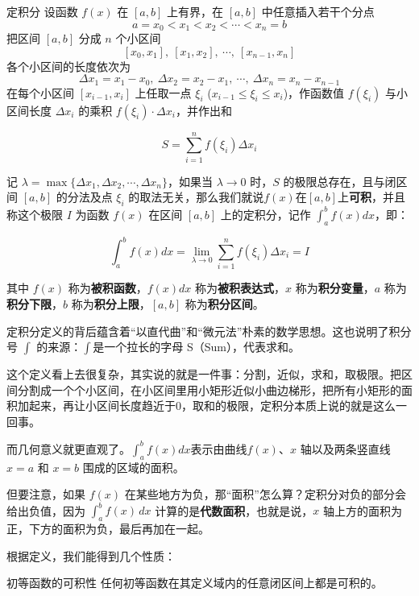 \begin{definition}{定积分}{}
设函数 \(f(x)\) 在 \([a,b]\) 上有界，在 \([a,b]\) 中任意插入若干个分点
\[
a=x_0<x_1<x_2<\cdots<x_n=b
\]
把区间 \([a,b]\) 分成 \(n\) 个小区间
\[
[x_0,x_1], \ [x_1,x_2], \ \cdots, \ [x_{n-1},x_n]
\]
各个小区间的长度依次为
\[
\Delta x_1=x_1-x_0, \ \Delta x_2=x_2-x_1, \ \cdots, \ \Delta x_n=x_n-x_{n-1}
\]
在每个小区间 \([x_{i-1},x_i]\) 上任取一点 \(\xi_i\) (\(x_{i-1} \leqslant \xi_i \leqslant x_i\))，作函数值 \(f(\xi_i)\) 与小区间长度 \(\Delta x_i\) 的乘积 \(f(\xi_i) \cdot \Delta x_i\)，并作出和

\[
S=\sum_{i=1}^{n} f(\xi_i) \Delta x_i
\]

记 \(\lambda = \max\{\Delta x_1, \Delta x_2, \cdots, \Delta x_n\}\)，如果当 \(\lambda \to 0\) 时，\(S\) 的极限总存在，且与闭区间 \([a,b]\) 的分法及点 \(\xi_i\) 的取法无关，那么我们就说\(f(x)\)在\([a,b]\)上\textbf{可积}，并且称这个极限 \(I\) 为函数 \(f(x)\) 在区间 \([a,b]\) 上的定积分，记作 \(\int_{a}^{b} f(x) dx\)，即：

\[
\int_{a}^{b} f(x) dx = \lim_{\lambda \to 0} \sum_{i=1}^{n} f(\xi_i) \Delta x_i = I
\]

其中 \(f(x)\) 称为\textbf{被积函数}，\(f(x) dx\) 称为\textbf{被积表达式}，\(x\) 称为\textbf{积分变量}，\(a\) 称为\textbf{积分下限}，\(b\) 称为\textbf{积分上限}，\([a,b]\) 称为\textbf{积分区间}。

\end{definition}

定积分定义的背后蕴含着“以直代曲”和“微元法”朴素的数学思想。这也说明了积分号 $\int$ 的来源：$\int$是一个拉长的字母 S（Sum），代表求和。

这个定义看上去很复杂，其实说的就是一件事：分割，近似，求和，取极限。把区间分割成一个个小区间，在小区间里用小矩形近似小曲边梯形，把所有小矩形的面积加起来，再让小区间长度趋近于$0$，取和的极限，定积分本质上说的就是这么一回事。

而几何意义就更直观了。$\int_{a}^{b} f(x) dx$表示由曲线$f(x)$、$x$ 轴以及两条竖直线 $x = a$ 和 $x = b$ 围成的区域的面积。

但要注意，如果 $f(x)$ 在某些地方为负，那“面积”怎么算？定积分对负的部分会给出负值，因为 $\int_a^b f(x)\, dx$ 计算的是\textbf{代数面积}，也就是说，$x$ 轴上方的面积为正，下方的面积为负，最后再加在一起。

根据定义，我们能得到几个性质：

\begin{theorem}{初等函数的可积性}{}
  任何初等函数在其定义域内的任意闭区间上都是可积的。
\end{theorem}

